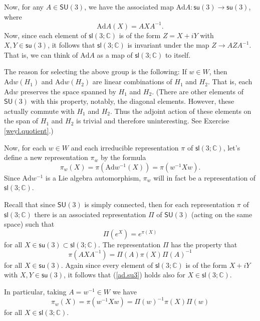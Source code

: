 \documentclass[12pt]{amsbook}
\theoremstyle{plain}
\numberwithin{equation}{chapter}
\numberwithin{theorem}{chapter}
\begin{document}
Now, for any $A\in\mathsf{SU}(3)$, we have the associated map $\mathrm{Ad}%
A:\mathsf{su}(3)\rightarrow\mathsf{su}(3)$, where
\[
\mathrm{Ad}A(X)=AXA^{-1}\text{.}%
\]
Now, since each element of $\mathsf{sl}\left(  3;\mathbb{C}\right)  $ is of
the form $Z=X+iY$ with $X,Y\in\mathsf{su}(3)$, it follows that $\mathsf{sl}%
\left(  3;\mathbb{C}\right)  $ is invariant under the map $Z\rightarrow
AZA^{-1}$. That is, we can think of $\mathrm{Ad}A$ as a map of $\mathsf{sl}%
\left(  3;\mathbb{C}\right)  $ to itself.

The reason for selecting the above group is the following: If $w\in W$, then
$\mathrm{Ad}w(H_{1})$ and $\mathrm{Ad}w(H_{2})$ are linear combinations of
$H_{1}$ and $H_{2}$. That is, each $\mathrm{Ad}w$ preserves the space spanned
by $H_{1}$ and $H_{2} $. (There are other elements of $\mathsf{SU}(3)$ with
this property, notably, the diagonal elements. However, these actually commute
with $H_{1}$ and $H_{2}$. Thus the adjoint action of these elements on the
span of $H_{1}$ and $H_{2}$ is trivial and therefore uninteresting. See
Exercise \ref{weyl.quotient}.)

Now, for each $w\in W$ and each irreducible representation $\pi$ of
$\mathsf{sl}\left(  3;\mathbb{C}\right)  $, let's define a new representation
$\pi_{w}$ by the formula
\[
\pi_{w}(X)=\pi\left(  \mathrm{Ad}w^{-1}(X)\right)  =\pi(w^{-1}Xw)\text{.}%
\]
Since $\mathrm{Ad}w^{-1}$ is a Lie algebra automorphism, $\pi_{w}$ will in
fact be a representation of $\mathsf{sl}\left(  3;\mathbb{C}\right)  $.

Recall that since $\mathsf{SU}(3)$ is simply connected, then for each
representation $\pi$ of $\mathsf{sl}\left(  3;\mathbb{C}\right)  $ there is an
associated representation $\Pi$ of $\mathsf{SU}(3)$ (acting on the same space)
such that
\[
\Pi\left(  e^{X}\right)  =e^{\pi(X)}%
\]
for all $X\in\mathsf{su}(3)\subset\mathsf{sl}\left(  3;\mathbb{C}\right)  $.
The representation $\Pi$ has the property that
\begin{equation}
\pi(AXA^{-1})=\Pi(A)\pi(X)\Pi(A)^{-1}\label{ad.su3}%
\end{equation}
for all $X\in\mathsf{su}(3)$. Again since every element of $\mathsf{sl}\left(
3;\mathbb{C}\right)  $ is of the form $X+iY$ with $X,Y\in\mathsf{su}(3)$, it
follows that (\ref{ad.su3}) holds also for $X\in\mathsf{sl}\left(
3;\mathbb{C}\right)  $.

In particular, taking $A=w^{-1}\in W$ we have
\begin{equation}
\pi_{w}(X)=\pi(w^{-1}Xw)=\Pi(w)^{-1}\pi(X)\Pi(w)\label{ad.weyl}%
\end{equation}
for all $X\in\mathsf{sl}\left(  3;\mathbb{C}\right)  $.
\end{document}
